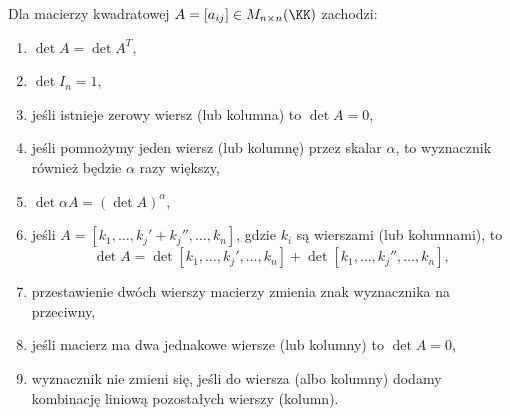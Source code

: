\begin{theorem}
    \label{t:determinant properties}
    Dla macierzy kwadratowej $A = [a_{ij}] \in M_{n\times n}(\KK)$ zachodzi:
    \begin{enumerate}
        \item $\det A = \det A^T$,
        \item $\det I_n = 1$,
        \item jeśli istnieje zerowy wiersz (lub kolumna) to $\det A = 0$,
        \item jeśli pomnożymy jeden wiersz (lub kolumnę) przez skalar $\alpha$, to wyznacznik również będzie $\alpha$ razy większy,
        \item $\det \alpha A = (\det A) ^ \alpha$,
        \item \label{t:p:determinant of a matrix with sum} jeśli $A = [k_1, \ldots, k_j' + k_j'', \ldots, k_n]$, gdzie $k_i$ są wierszami (lub kolumnami), to
              \[ \det A = \det [k_1, \ldots, k_j', \ldots, k_n] + \det [k_1, \ldots, k_j'', \ldots, k_n], \]
        \item przestawienie dwóch wierszy macierzy zmienia znak wyznacznika na przeciwny,
        \item \label{t:p:determinant of a matrix with same rows} jeśli macierz ma dwa jednakowe wiersze (lub kolumny) to $\det A = 0$,
        \item wyznacznik nie zmieni się, jeśli do wiersza (albo kolumny) dodamy kombinację liniową pozostałych wierszy (kolumn).
    \end{enumerate}
\end{theorem}
